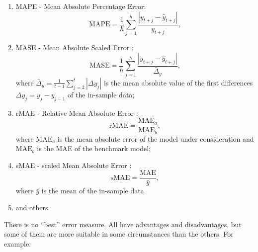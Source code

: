 \documentclass[
]{book}
\providecommand{\tightlist}{%
  \setlength{\itemsep}{0pt}\setlength{\parskip}{0pt}}
\theoremstyle{definition}
\theoremstyle{definition}
\theoremstyle{definition}
\theoremstyle{definition}
\theoremstyle{remark}
\begin{document}
\begin{enumerate}
\def\labelenumi{\arabic{enumi}.}
\tightlist
\item
  MAPE - Mean Absolute Percentage Error:
  \begin{equation}
   \mathrm{MAPE} = \frac{1}{h} \sum_{j=1}^h \frac{|y_{t+j} - \hat{y}_{t+j}|}{y_{t+j}},
   \label{eq:MAPE}
  \end{equation}
\item
  MASE - Mean Absolute Scaled Error \citep{Hyndman2006}:
  \begin{equation}
   \mathrm{MASE} = \frac{1}{h} \sum_{j=1}^h \frac{|y_{t+j} - \hat{y}_{t+j}|}{\bar{\Delta}_y},
   \label{eq:MASE}
  \end{equation}
  where \(\bar{\Delta}_y = \frac{1}{t-1}\sum_{j=2}^t |\Delta y_{j}|\) is the mean absolute value of the first differences \(\Delta y_{j}=y_j-y_{j-1}\) of the in-sample data;
\item
  rMAE - Relative Mean Absolute Error \citep{Davydenko2013}:
  \begin{equation}
   \mathrm{rMAE} = \frac{\mathrm{MAE}_a}{\mathrm{MAE}_b},
   \label{eq:rMAE}
  \end{equation}
  where \(\mathrm{MAE}_a\) is the mean absolute error of the model under consideration and \(\mathrm{MAE}_b\) is the MAE of the benchmark model;
\item
  sMAE - scaled Mean Absolute Error \citep{Petropoulos2015}:
  \begin{equation}
   \mathrm{sMAE} = \frac{\mathrm{MAE}}{\bar{y}},
   \label{eq:sMAE}
  \end{equation}
  where \(\bar{y}\) is the mean of the in-sample data.
\item
  and others.
\end{enumerate}

There is no ``best'' error measure. All have advantages and disadvantages, but some of them are more suitable in some circumstances than the others. For example:
\end{document}
